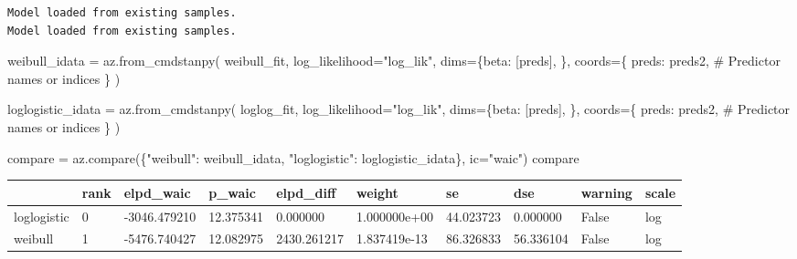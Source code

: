 \documentclass[
  letterpaper,
  DIV=11,
  numbers=noendperiod]{scrartcl}
\newenvironment{Shaded}{\begin{snugshade}}{\end{snugshade}}
\newcommand{\CommentTok}[1]{\textcolor[rgb]{0.37,0.37,0.37}{#1}}
\newcommand{\NormalTok}[1]{\textcolor[rgb]{0.00,0.23,0.31}{#1}}
\newcommand{\OperatorTok}[1]{\textcolor[rgb]{0.37,0.37,0.37}{#1}}
\newcommand{\StringTok}[1]{\textcolor[rgb]{0.13,0.47,0.30}{#1}}
\begin{document}
\begin{verbatim}
Model loaded from existing samples.
Model loaded from existing samples.
\end{verbatim}

\begin{Shaded}
\begin{Highlighting}[]
\NormalTok{weibull\_idata }\OperatorTok{=}\NormalTok{ az.from\_cmdstanpy(}
\NormalTok{    weibull\_fit,}
\NormalTok{    log\_likelihood}\OperatorTok{=}\StringTok{"log\_lik"}\NormalTok{,}
\NormalTok{    dims}\OperatorTok{=}\NormalTok{\{}\StringTok{\textquotesingle{}beta\textquotesingle{}}\NormalTok{: [}\StringTok{\textquotesingle{}preds\textquotesingle{}}\NormalTok{], \},}
\NormalTok{    coords}\OperatorTok{=}\NormalTok{\{}
        \StringTok{\textquotesingle{}preds\textquotesingle{}}\NormalTok{: preds2,  }\CommentTok{\# Predictor names or indices}
\NormalTok{    \}}
\NormalTok{)}

\NormalTok{loglogistic\_idata }\OperatorTok{=}\NormalTok{ az.from\_cmdstanpy(}
\NormalTok{    loglog\_fit,}
\NormalTok{    log\_likelihood}\OperatorTok{=}\StringTok{"log\_lik"}\NormalTok{,}
\NormalTok{    dims}\OperatorTok{=}\NormalTok{\{}\StringTok{\textquotesingle{}beta\textquotesingle{}}\NormalTok{: [}\StringTok{\textquotesingle{}preds\textquotesingle{}}\NormalTok{], \},}
\NormalTok{    coords}\OperatorTok{=}\NormalTok{\{}
        \StringTok{\textquotesingle{}preds\textquotesingle{}}\NormalTok{: preds2,  }\CommentTok{\# Predictor names or indices}
\NormalTok{    \}}
\NormalTok{)}
\end{Highlighting}
\end{Shaded}

\begin{Shaded}
\begin{Highlighting}[]
\NormalTok{compare }\OperatorTok{=}\NormalTok{ az.compare(\{}\StringTok{"weibull"}\NormalTok{: weibull\_idata, }\StringTok{"loglogistic"}\NormalTok{: loglogistic\_idata\}, ic}\OperatorTok{=}\StringTok{"waic"}\NormalTok{)}
\NormalTok{compare}
\end{Highlighting}
\end{Shaded}

\begin{longtable}[]{@{}llllllllll@{}}
\toprule\noalign{}
& rank & elpd\_waic & p\_waic & elpd\_diff & weight & se & dse & warning
& scale \\
\midrule\noalign{}
\endhead
\bottomrule\noalign{}
\endlastfoot
loglogistic & 0 & -3046.479210 & 12.375341 & 0.000000 & 1.000000e+00 &
44.023723 & 0.000000 & False & log \\
weibull & 1 & -5476.740427 & 12.082975 & 2430.261217 & 1.837419e-13 &
86.326833 & 56.336104 & False & log \\
\end{longtable}
\end{document}
